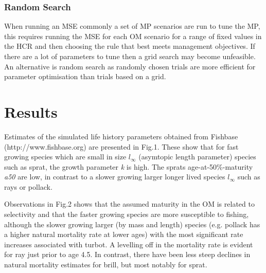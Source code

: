 \documentclass[preprint,12pt]{elsarticle}
\begin{document}
\subsubsection{Random Search}


When running an MSE commonly a set of MP scenarios are run to tune the MP, this requires running the MSE for each OM scenario for a range of fixed values in the HCR and then choosing the rule that best meets management objectives. If there are a lot of parameters to tune then a grid search may become unfeasible. An alternative is random search \cite{bergstra2012random} as randomly chosen trials are more efficient for parameter optimisation than trials based on a grid. 

  
\section{Results}

Estimates of the simulated life history parameters obtained from Fishbase (http://www.fishbase.org) are presented in Fig.1. These show that for fast growing species which are small in size $l_{\infty}$ (asymtopic length parameter) species such as sprat, the growth parameter \textit{k} is high. The sprats age-at-50\%-maturity \textit{a50} are low, in contrast to a slower growing larger longer lived species $l_{\infty}$ such as rays or pollack.

Observations in Fig.2 shows that the assumed maturity in the OM is related to selectivity and that the faster growing species are more susceptible to fishing, although the slower growing larger (by mass and length) species (e.g. pollack has a higher natural mortality rate at lower ages) with the most significant rate increases associated with turbot. A levelling off in the mortality rate is evident for ray just prior to age 4.5. In contrast, there have been less steep declines in natural mortality estimates for brill, but most notably for sprat. 
\end{document}
